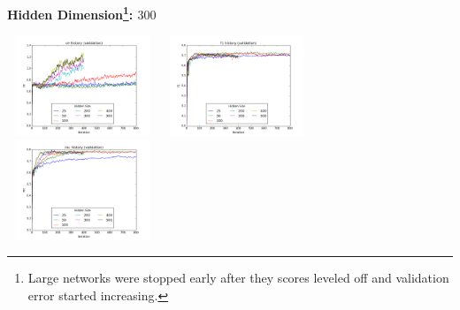 \documentclass{article} %
\begin{document}
\begin{appendices}
\textbf{Hidden Dimension\footnote{Large networks were stopped early after they scores leveled off and validation error started increasing.}: $300$}

\includegraphics[width=4.5cm, height=3cm]{ce_history_validation_Hidden_Size.png}
\includegraphics[width=4.5cm, height=3cm]{f1_history_validation_Hidden_Size.png}
\includegraphics[width=4.5cm, height=3cm]{roc_history_validation_Hidden_Size.png}
\end{appendices}
\end{document}
